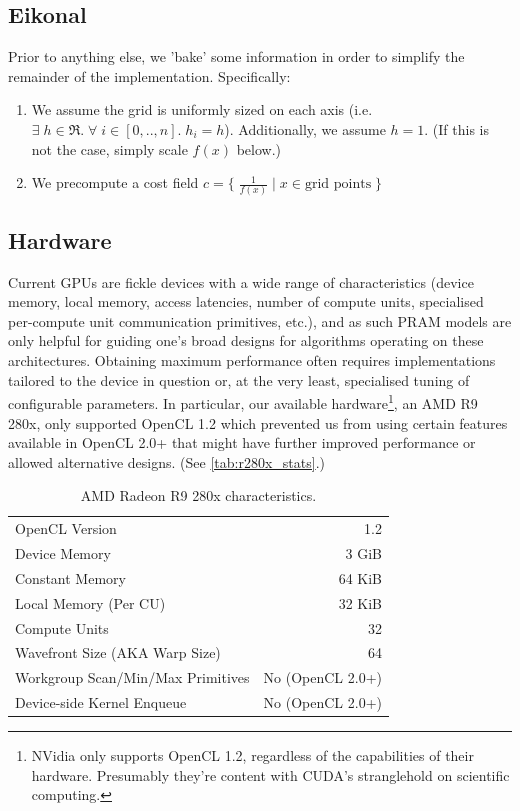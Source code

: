 \documentclass[11pt]{article}       %
\begin{document}
\subsection{Eikonal}

Prior to anything else, we 'bake' some information in order to simplify the remainder of the implementation. Specifically:
\begin{enumerate}[noitemsep]
\item We assume the grid is uniformly sized on each axis (i.e. $\exists \; h \in \Re. \; \forall \; i \in [0, .., n]. \; h_i = h$). Additionally, we assume $h = 1$. (If this is not the case, simply scale $f(x)$ below.)
\item We precompute a cost field $c = \{ \; \frac{1}{f(x)}  \; | \; x \in \text{grid points} \; \}$
\end{enumerate}



\subsection{Hardware}

Current GPUs are fickle devices with a wide range of characteristics (device memory, local memory, access latencies, number of compute units, specialised per-compute unit communication primitives, etc.), and as such PRAM models are only helpful for guiding one's broad designs for algorithms operating on these architectures. Obtaining maximum performance often requires implementations tailored to the device in question or, at the very least, specialised tuning of configurable parameters. In particular, our available hardware\footnote{NVidia only supports OpenCL 1.2, regardless of the capabilities of their hardware. Presumably they're content with CUDA's stranglehold on scientific computing.}, an AMD R9 280x, only supported OpenCL 1.2 which prevented us from using certain features available in OpenCL 2.0+ that might have further improved performance or allowed alternative designs. (See \autoref{tab:r280x_stats}.)

\begin{table}
\centering
\begin{tabular}{|l|r|}
\cline{1-2} OpenCL Version						& 1.2    \\
\cline{1-2} Device Memory						& 3 GiB  \\
\cline{1-2} Constant Memory						& 64 KiB \\
\cline{1-2} Local Memory (Per CU)				& 32 KiB \\
\cline{1-2} Compute Units						& 32     \\
\cline{1-2} Wavefront Size (AKA Warp Size)		& 64     \\
\cline{1-2} Workgroup Scan/Min/Max Primitives	& No (OpenCL 2.0+) \\
\cline{1-2} Device-side Kernel Enqueue			& No (OpenCL 2.0+) \\
\cline{1-2}
\end{tabular}
\caption{AMD Radeon R9 280x characteristics.}
\label{tab:r280x_stats}
\end{table}
\end{document}
